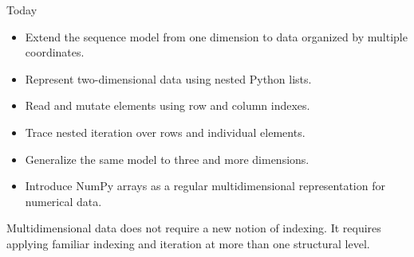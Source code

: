 \documentclass[aspectratio=169,10pt]{beamer}
\begin{document}
\makedecktitle

\begin{frame}{Today}
  \begin{itemize}
    \item Extend the sequence model from one dimension to data organized by multiple coordinates.
    \item Represent two-dimensional data using nested Python lists.
    \item Read and mutate elements using row and column indexes.
    \item Trace nested iteration over rows and individual elements.
    \item Generalize the same model to three and more dimensions.
    \item Introduce NumPy arrays as a regular multidimensional representation for numerical data.
  \end{itemize}

  \begin{keyidea}
    Multidimensional data does not require a new notion of indexing. It requires applying familiar indexing and iteration at more than one structural level.
  \end{keyidea}
\end{frame}
\end{document}

